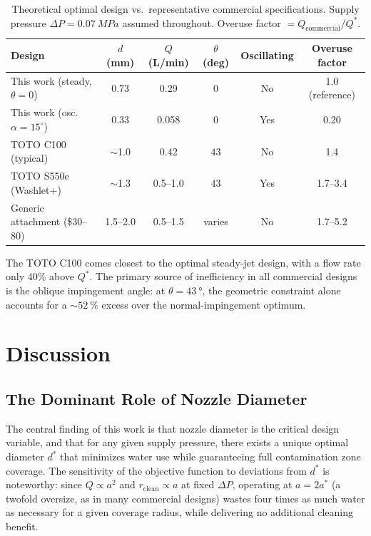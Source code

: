 \documentclass[aps,prfluids,reprint,amsmath,amssymb,floatfix]{revtex4-2}
\begin{document}
\begin{table}[H]
\centering
\caption{Theoretical optimal design vs.\ representative commercial
specifications. Supply pressure $\Delta P = \SI{0.07}{MPa}$ assumed
throughout. Overuse factor $= Q_\mathrm{commercial}/Q^*$.}
\label{tab:commercial}
\renewcommand{\arraystretch}{1.3}
\begin{tabular}{lccccc}
\toprule
\textbf{Design} & $d$ (mm) & $Q$ (L/min) & $\theta$ (deg)
  & Oscillating & Overuse factor \\
\midrule
This work (steady, $\theta=0$) & 0.73 & 0.29 & 0 & No  & 1.0 (reference) \\
This work (osc.\ $\alpha=15^\circ$) & 0.33 & 0.058 & 0 & Yes & 0.20 \\
TOTO C100 (typical)            & $\sim$1.0 & 0.42 & $43$ & No  & 1.4 \\
TOTO S550e (Washlet+)          & $\sim$1.3 & 0.5--1.0 & $43$ & Yes & 1.7--3.4 \\
Generic attachment (\$30--80)  & 1.5--2.0  & 0.5--1.5 & varies & No & 1.7--5.2 \\
\bottomrule
\end{tabular}
\end{table}

The TOTO C100 comes closest to the optimal steady-jet design, with a flow
rate only 40\% above $Q^*$. The primary source of inefficiency in all
commercial designs is the oblique impingement angle: at $\theta = \SI{43}{\degree}$,
the geometric constraint alone accounts for a $\sim\SI{52}{\percent}$
excess over the normal-impingement optimum.

\section{Discussion}
\label{sec:discussion}

\subsection{The Dominant Role of Nozzle Diameter}
\label{subsec:disc_nozzle}

The central finding of this work is that nozzle diameter is the critical
design variable, and that for any given supply pressure, there exists a
unique optimal diameter $d^*$ that minimizes water use while guaranteeing
full contamination zone coverage. The sensitivity of the objective function
to deviations from $d^*$ is noteworthy: since $Q \propto a^2$ and
$r_\mathrm{clean} \propto a$ at fixed $\Delta P$, operating at $a = 2a^*$
(a twofold oversize, as in many commercial designs) wastes four times as
much water as necessary for a given coverage radius, while delivering no
additional cleaning benefit.
\end{document}
